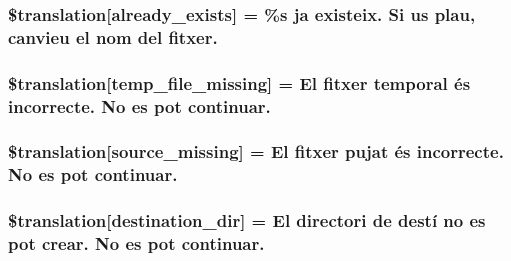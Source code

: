 \subsubsection[{\$translation}]{\setlength{\rightskip}{0pt plus 5cm}\$translation\mbox{[}\textquotesingle{}already\+\_\+exists\textquotesingle{}\mbox{]} = \textquotesingle{}\%s ja existeix. Si us plau, canvieu el nom del fitxer.\textquotesingle{}}\label{class_8upload_8ca___c_a_8php_afd84e910217f04139f567c41e292afa5}
\hypertarget{class_8upload_8ca___c_a_8php_ab0fa87a88aba2624004581eed0633325}{}
\subsubsection[{\$translation}]{\setlength{\rightskip}{0pt plus 5cm}\$translation\mbox{[}\textquotesingle{}temp\+\_\+file\+\_\+missing\textquotesingle{}\mbox{]} = \textquotesingle{}El fitxer temporal és incorrecte. No es pot continuar.\textquotesingle{}}\label{class_8upload_8ca___c_a_8php_ab0fa87a88aba2624004581eed0633325}
\hypertarget{class_8upload_8ca___c_a_8php_aceaaf7355acaaf10f0ae60378d03c468}{}
\subsubsection[{\$translation}]{\setlength{\rightskip}{0pt plus 5cm}\$translation\mbox{[}\textquotesingle{}source\+\_\+missing\textquotesingle{}\mbox{]} = \textquotesingle{}El fitxer pujat és incorrecte. No es pot continuar.\textquotesingle{}}\label{class_8upload_8ca___c_a_8php_aceaaf7355acaaf10f0ae60378d03c468}
\hypertarget{class_8upload_8ca___c_a_8php_aff2427c72a2598aefa6d58df1dd18b08}{}
\subsubsection[{\$translation}]{\setlength{\rightskip}{0pt plus 5cm}\$translation\mbox{[}\textquotesingle{}destination\+\_\+dir\textquotesingle{}\mbox{]} = \textquotesingle{}El directori de destí no es pot crear. No es pot continuar.\textquotesingle{}}\label{class_8upload_8ca___c_a_8php_aff2427c72a2598aefa6d58df1dd18b08}
\hypertarget{class_8upload_8ca___c_a_8php_a9ef28d3cf09942c6c0a1e77fa09185e8}{}
